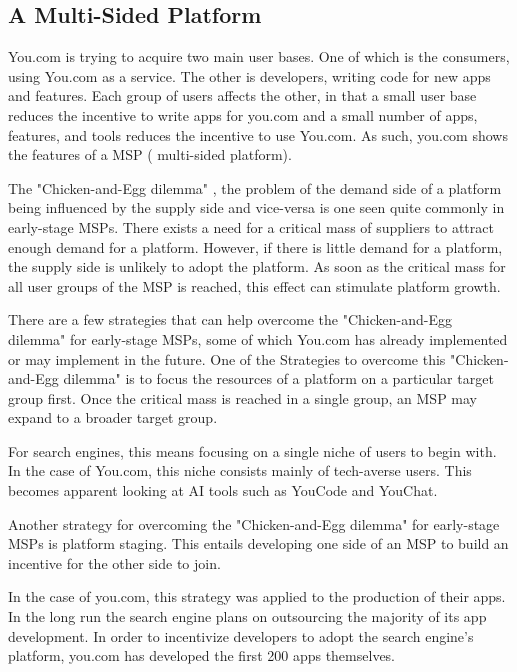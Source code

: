 \documentclass[5p,twocolumn,final]{elsarticle}
\begin{document}
\subsection{A Multi-Sided Platform}
You.com is trying to acquire two main user bases. One of which is the consumers, using You.com as a service. The other is developers, writing code for new apps and features. 
Each group of users affects the other, in that a small user base reduces the incentive to write apps for you.com and a small number of apps, features, and tools reduces the incentive to use You.com. As such, you.com shows the features of a MSP ( multi-sided platform). \par
%
The "Chicken-and-Egg dilemma" \cite{caillaud2003}, the problem of the demand side of a platform being influenced by the supply side and vice-versa is one seen quite commonly in early-stage MSPs.
There exists a need for a critical mass of suppliers to attract enough demand for a platform. However, if there is little demand for a platform, the supply side is unlikely to adopt the platform.
As soon as the critical mass for all user groups of the MSP is reached, this effect can stimulate platform growth.\par
%
There are a few strategies that can help overcome the "Chicken-and-Egg dilemma" for early-stage MSPs, some of which You.com has already implemented or may implement in the future. 
One of the Strategies to overcome this "Chicken-and-Egg dilemma" is to focus the resources of a platform on a particular target group first. Once the critical mass is reached in a single group, an MSP may expand to a broader target group.\cite[Section 2.1]{linde2009pricing}\par 
%
For search engines, this means focusing on a single niche of users to begin with. In the case of You.com, this niche consists mainly of tech-averse users. This becomes apparent looking at AI tools such as YouCode and YouChat.\par
%
Another strategy for overcoming the "Chicken-and-Egg dilemma" for early-stage MSPs is platform staging. This entails developing one side of an MSP to build an incentive for the other side to join.\cite[Section 2.2]{linde2009pricing}\par
%
In the case of you.com, this strategy was applied to the production of their apps. In the long run the search engine plans on outsourcing the majority of its app development. In order to incentivize developers to adopt the search engine's platform, you.com has developed the first 200 apps themselves.~\cite{techcrunch2022}
\end{document}
